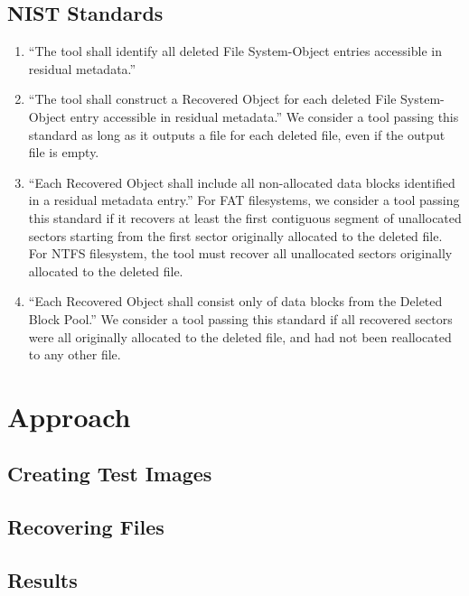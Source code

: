 \documentclass{mcurcsm}
\begin{document}
\subsection{NIST Standards}
\begin{enumerate} %
 \item ``The tool shall identify all deleted File System-Object entries accessible in residual metadata.''
 \item ``The tool shall construct a Recovered Object for each deleted File System-Object entry accessible in residual metadata.''
 We consider a tool passing this standard as long as it outputs a file for each deleted file, even if the output file is empty.
 \item ``Each Recovered Object shall include all non-allocated data blocks identified in a residual metadata entry.'' For FAT filesystems, we consider a tool passing this standard if it recovers at least the first contiguous segment of unallocated sectors starting from the first sector originally allocated to the deleted file. For NTFS filesystem, the tool must recover all unallocated sectors originally allocated to the deleted file.
 \item ``Each Recovered Object shall consist only of data blocks from the Deleted Block Pool.''
 We consider a tool passing this standard if all recovered sectors were all originally allocated to the deleted file, and had not been reallocated to any other file.
\end{enumerate}


\balance

\section{Approach}

\subsection{Creating Test Images}

\subsection{Recovering Files}

\subsection{Results}
\end{document}
